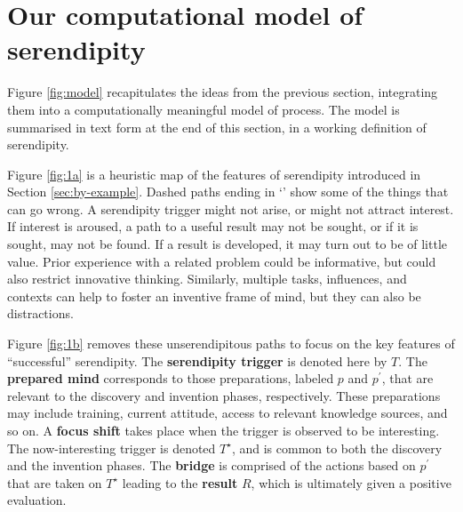 \section{Our computational model of serendipity} \label{sec:our-model}

Figure \ref{fig:model} recapitulates the ideas from the previous
section, integrating them into a computationally meaningful model of
process.  The model is summarised in text form at the end of this
section, in a working definition of serendipity.

Figure \ref{fig:1a} is a heuristic map of the features of serendipity
introduced in Section \ref{sec:by-example}.
%
Dashed paths ending in `\ymark' show some of the things that can go
wrong.  A serendipity trigger might not arise, or might not attract
interest.  If interest is aroused, a path to a useful result may not
be sought, or if it is sought, may not be found.  If a result is
developed, it may turn out to be of little value.  Prior experience
with a related problem could be informative, but could also restrict
innovative thinking.  Similarly, multiple tasks, influences, and
contexts can help to foster an inventive frame of mind, but they can
also be distractions.

Figure \ref{fig:1b} removes these unserendipitous paths to focus on
the key features of ``successful'' serendipity.
%
The \textbf{serendipity trigger} is denoted here by $T$.  
%
The \textbf{prepared mind} corresponds to those preparations, labeled
$p$ and $p^{\prime}$, that are relevant to the discovery and invention
phases, respectively.  These preparations may include training,
current attitude, access to relevant knowledge sources, and so on.
%
A \textbf{focus shift} takes place when the trigger is observed to be
interesting.  The now-interesting trigger is denoted $T^\star$, and is
common to both the discovery and the invention phases.
%
%
The \textbf{bridge} is comprised of the actions based on $p^{\prime}$
that are taken on $T^\star$ leading to the \textbf{result} $R$, which is ultimately given a positive evaluation.

